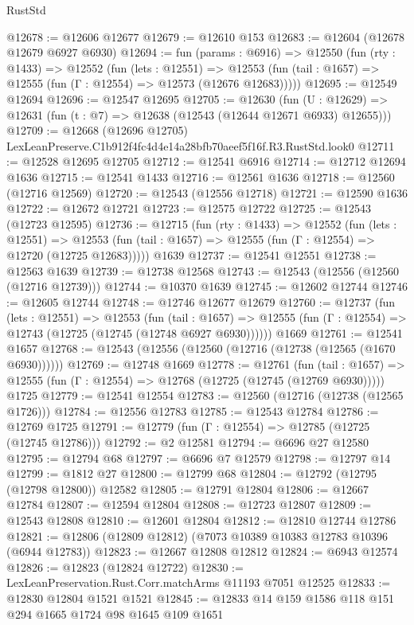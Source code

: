 \begin{lexlean}{RustStd}
\begin{coremodule}
@12678 := @12606 @12677
@12679 := @12610 @153
@12683 := @12604 (@12678 @12679 @6927 @6930)
@12694 := fun (params : @6916) =>
  @12550
    (fun (rty : @1433) =>
    @12552
      (fun (lets : @12551) =>
      @12553 (fun (tail : @1657) => @12555 (fun (Γ : @12554) => @12573 (@12676 @12683)))))
@12695 := @12549 @12694
@12696 := @12547 @12695
@12705 := @12630
    (fun (U : @12629) => @12631 (fun (t : @7) => @12638 (@12543 (@12644 @12671 @6933) @12655)))
@12709 := @12668 (@12696 @12705) LexLeanPreserve.C1b912f4fc4d4e14a28bfb70aeef5f16f.R3.RustStd.look0
@12711 := @12528 @12695 @12705
@12712 := @12541 @6916
@12714 := @12712 @12694 @1636
@12715 := @12541 @1433
@12716 := @12561 @1636
@12718 := @12560 (@12716 @12569)
@12720 := @12543 (@12556 @12718)
@12721 := @12590 @1636
@12722 := @12672 @12721
@12723 := @12575 @12722
@12725 := @12543 (@12723 @12595)
@12736 := @12715
    (fun (rty : @1433) =>
    @12552
      (fun (lets : @12551) =>
      @12553 (fun (tail : @1657) => @12555 (fun (Γ : @12554) => @12720 (@12725 @12683)))))
    @1639
@12737 := @12541 @12551
@12738 := @12563 @1639
@12739 := @12738 @12568
@12743 := @12543 (@12556 (@12560 (@12716 @12739)))
@12744 := @10370 @1639
@12745 := @12602 @12744
@12746 := @12605 @12744
@12748 := @12746 @12677 @12679
@12760 := @12737
    (fun (lets : @12551) =>
    @12553
      (fun (tail : @1657) =>
      @12555 (fun (Γ : @12554) => @12743 (@12725 (@12745 (@12748 @6927 @6930))))))
    @1669
@12761 := @12541 @1657
@12768 := @12543 (@12556 (@12560 (@12716 (@12738 (@12565 (@1670 @6930))))))
@12769 := @12748 @1669
@12778 := @12761
    (fun (tail : @1657) => @12555 (fun (Γ : @12554) => @12768 (@12725 (@12745 (@12769 @6930)))))
    @1725
@12779 := @12541 @12554
@12783 := @12560 (@12716 (@12738 (@12565 @1726)))
@12784 := @12556 @12783
@12785 := @12543 @12784
@12786 := @12769 @1725
@12791 := @12779 (fun (Γ : @12554) => @12785 (@12725 (@12745 @12786)))
@12792 := @2 @12581
@12794 := @6696 @27 @12580
@12795 := @12794 @68
@12797 := @6696 @7 @12579
@12798 := @12797 @14
@12799 := @1812 @27
@12800 := @12799 @68
@12804 := @12792 (@12795 (@12798 @12800)) @12582
@12805 := @12791 @12804
@12806 := @12667 @12784
@12807 := @12594 @12804
@12808 := @12723 @12807
@12809 := @12543 @12808
@12810 := @12601 @12804
@12812 := @12810 @12744 @12786
@12821 := @12806 (@12809 @12812) (@7073 @10389 @10383 @12783 @10396 (@6944 @12783))
@12823 := @12667 @12808 @12812
@12824 := @6943 @12574
@12826 := @12823 (@12824 @12722)
@12830 := LexLeanPreservation.Rust.Corr.matchArms @11193 @7051 @12525
@12833 := @12830 @12804 @1521 @1521
@12845 := @12833 @14 @159 @1586 @118 @151 @294 @1665 @1724 @98 @1645 @109 @1651

\end{coremodule}
\end{lexlean}
